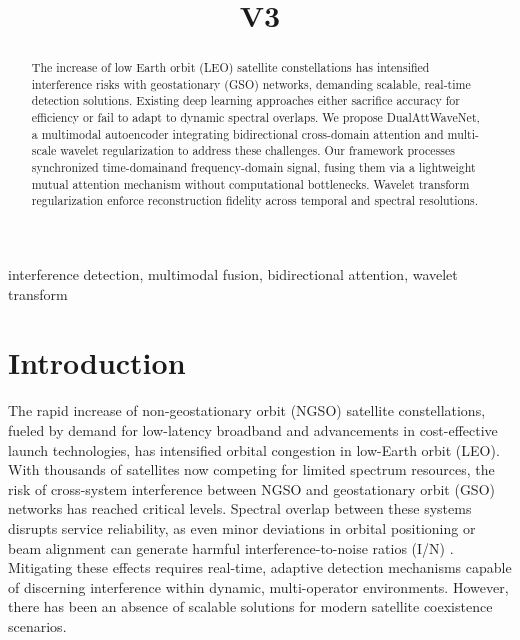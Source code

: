 \documentclass[conference]{IEEEtran}
\begin{document}
\title{V3}

\author{
}

\maketitle

\begin{abstract}
    The increase of low Earth orbit (LEO) satellite constellations has intensified interference risks with geostationary (GSO) networks, demanding scalable, real-time detection solutions. Existing deep learning approaches either sacrifice accuracy for efficiency or fail to adapt to dynamic spectral overlaps. We propose DualAttWaveNet, a multimodal autoencoder integrating bidirectional cross-domain attention and multi-scale wavelet regularization to address these challenges. Our framework processes synchronized time-domainand frequency-domain signal, fusing them via a lightweight mutual attention mechanism without computational bottlenecks. Wavelet transform regularization enforce reconstruction fidelity across temporal and spectral resolutions.
\end{abstract}

\begin{IEEEkeywords}
    interference detection, multimodal fusion, bidirectional attention, wavelet transform
\end{IEEEkeywords}

\section{Introduction}

The rapid increase of non-geostationary orbit (NGSO) satellite constellations, fueled by demand for low-latency broadband and advancements in cost-effective launch technologies, has intensified orbital congestion in low-Earth orbit (LEO). With thousands of satellites now competing for limited spectrum resources, the risk of cross-system interference between NGSO and geostationary orbit (GSO) networks has reached critical levels. Spectral overlap between these systems disrupts service reliability, as even minor deviations in orbital positioning or beam alignment can generate harmful interference-to-noise ratios (I/N) \cite{itu2020}. Mitigating these effects requires real-time, adaptive detection mechanisms capable of discerning interference within dynamic, multi-operator environments. However, there has been an absence of scalable solutions for modern satellite coexistence scenarios.
\end{document}
